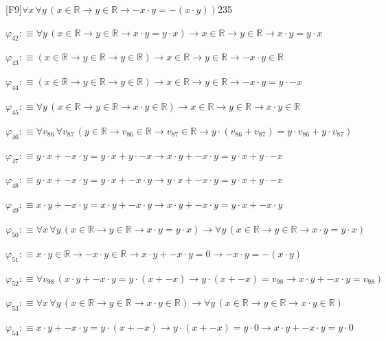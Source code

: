 \begin{fullproof}{[F9]}{$\forall x\,\forall y\,(x \in \mathbb{R} \to y \in \mathbb{R} \to -x \cdot y = -(x \cdot y))$}{235}
\begin{abbrevlist}
\item $\varphi_{42} :\equiv \forall y\,(x \in \mathbb{R} \to y \in \mathbb{R} \to x \cdot y = y \cdot x) \to x \in \mathbb{R} \to y \in \mathbb{R} \to x \cdot y = y \cdot x$
\item $\varphi_{43} :\equiv (x \in \mathbb{R} \to y \in \mathbb{R} \to y \in \mathbb{R}) \to x \in \mathbb{R} \to y \in \mathbb{R} \to -x \cdot y \in \mathbb{R}$
\item $\varphi_{44} :\equiv (x \in \mathbb{R} \to y \in \mathbb{R} \to y \in \mathbb{R}) \to x \in \mathbb{R} \to y \in \mathbb{R} \to -x \cdot y = y \cdot -x$
\item $\varphi_{45} :\equiv \forall y\,(x \in \mathbb{R} \to y \in \mathbb{R} \to x \cdot y \in \mathbb{R}) \to x \in \mathbb{R} \to y \in \mathbb{R} \to x \cdot y \in \mathbb{R}$
\item $\varphi_{46} :\equiv \forall v_{86}\,\forall v_{87}\,(y \in \mathbb{R} \to v_{86} \in \mathbb{R} \to v_{87} \in \mathbb{R} \to y \cdot (v_{86} + v_{87}) = y \cdot v_{86} + y \cdot v_{87})$
\item $\varphi_{47} :\equiv y \cdot x + -x \cdot y = y \cdot x + y \cdot -x \to x \cdot y + -x \cdot y = y \cdot x + y \cdot -x$
\item $\varphi_{48} :\equiv y \cdot x + -x \cdot y = y \cdot x + -x \cdot y \to y \cdot x + -x \cdot y = y \cdot x + y \cdot -x$
\item $\varphi_{49} :\equiv x \cdot y + -x \cdot y = x \cdot y + -x \cdot y \to x \cdot y + -x \cdot y = y \cdot x + -x \cdot y$
\item $\varphi_{50} :\equiv \forall x\,\forall y\,(x \in \mathbb{R} \to y \in \mathbb{R} \to x \cdot y = y \cdot x) \to \forall y\,(x \in \mathbb{R} \to y \in \mathbb{R} \to x \cdot y = y \cdot x)$
\item $\varphi_{51} :\equiv x \cdot y \in \mathbb{R} \to -x \cdot y \in \mathbb{R} \to x \cdot y + -x \cdot y = 0 \to -x \cdot y = -(x \cdot y)$
\item $\varphi_{52} :\equiv \forall v_{98}\,(x \cdot y + -x \cdot y = y \cdot (x + -x) \to y \cdot (x + -x) = v_{98} \to x \cdot y + -x \cdot y = v_{98})$
\item $\varphi_{53} :\equiv \forall x\,\forall y\,(x \in \mathbb{R} \to y \in \mathbb{R} \to x \cdot y \in \mathbb{R}) \to \forall y\,(x \in \mathbb{R} \to y \in \mathbb{R} \to x \cdot y \in \mathbb{R})$
\item $\varphi_{54} :\equiv x \cdot y + -x \cdot y = y \cdot (x + -x) \to y \cdot (x + -x) = y \cdot 0 \to x \cdot y + -x \cdot y = y \cdot 0$

\end{abbrevlist}
\end{fullproof}
